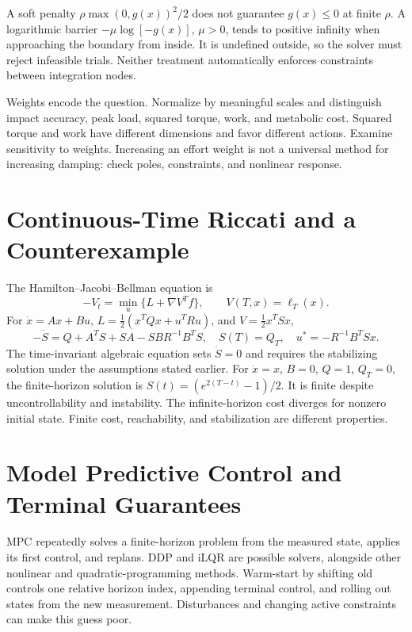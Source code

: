 A soft penalty $\rho\max(0,g(x))^2/2$ does not guarantee $g(x)\le0$ at finite
$\rho$. A logarithmic barrier $-\mu\log[-g(x)]$, $\mu>0$, tends to positive
infinity when approaching the boundary from inside. It is undefined outside,
so the solver must reject infeasible trials. Neither treatment automatically
enforces constraints between integration nodes.

Weights encode the question. Normalize by meaningful scales and distinguish
impact accuracy, peak load, squared torque, work, and metabolic cost. Squared
torque and work have different dimensions and favor different actions. Examine
sensitivity to weights. Increasing an effort weight is not a universal method
for increasing damping: check poles, constraints, and nonlinear response.

\section{Continuous-Time Riccati and a Counterexample}

The Hamilton--Jacobi--Bellman equation is
\begin{equation}
-V_t=\min_u\{L+\nabla V^Tf\},\qquad V(T,x)=\ell_T(x).
\label{eq:ch5:hjb}
\end{equation}
For $\dot x=Ax+Bu$, $L=\tfrac12(x^TQx+u^TRu)$, and $V=\tfrac12x^TSx$,
\begin{equation}
-\dot S=Q+A^TS+SA-SBR^{-1}B^TS,\quad S(T)=Q_T,\quad u^*=-R^{-1}B^TSx.
\label{eq:ch5:DRE}
\end{equation}
The time-invariant algebraic equation sets $\dot S=0$ and requires the
stabilizing solution under the assumptions stated earlier.
For $\dot x=x$, $B=0$, $Q=1$, $Q_T=0$, the finite-horizon solution is
$S(t)=(e^{2(T-t)}-1)/2$. It is finite despite uncontrollability and instability.
The infinite-horizon cost diverges for nonzero initial state. Finite cost,
reachability, and stabilization are different properties.

\section{Model Predictive Control and Terminal Guarantees}

MPC repeatedly solves a finite-horizon problem from the measured state,
applies its first control, and replans. DDP and iLQR are possible solvers,
alongside other nonlinear and quadratic-programming methods. Warm-start by
shifting old controls one relative horizon index, appending terminal control,
and rolling out states from the new measurement. Disturbances and changing
active constraints can make this guess poor.


